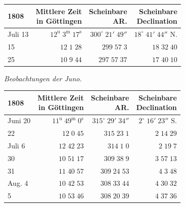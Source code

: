 \begin{center}\fontsize{10}{12}\selectfont\setlength{\tabcolsep}{3pt}\renewcommand{\arraystretch}{1.15}\begin{tabular}{lrrr}
1808 & \shortstack{Mittlere Zeit\\in Göttingen} & \shortstack{Scheinbare\\AR.} & \shortstack{Scheinbare\\Declination}\\\hline
Juli 13 & $12^{\text{u}}\;3^{\text{m}}\;17^{\text{s}}$ & $300^\circ\;21'\;49''$ & $18^\circ\;41'\;44''$ N.\\
15 & $12\;1\;28$ & $299\;57\;3$ & $18\;32\;40$\\
25 & $10\;9\;44$ & $297\;57\;37$ & $17\;40\;10$\\
\end{tabular}\end{center}


\begin{center}
\emph{Beobachtungen der Juno.}
\end{center}


\begin{center}\fontsize{10}{12}\selectfont\setlength{\tabcolsep}{3pt}\renewcommand{\arraystretch}{1.15}\begin{tabular}{lrrr}
1808 & \shortstack{Mittlere Zeit\\in Göttingen} & \shortstack{Scheinbare\\AR.} & \shortstack{Scheinbare\\Declination}\\\hline
Juni 20 & $11^{\text{u}}\;49^{\text{m}}\;0^{\text{s}}$ & $315^\circ\;29'\;34''$ & $2^\circ\;16'\;23''$ S.\\
22 & $12\;0\;45$ & $315\;23\;1$ & $2\;14\;29$\\
Juli 6 & $12\;42\;23$ & $314\;1\;0$ & $2\;19\;7$\\
30 & $10\;51\;17$ & $309\;38\;9$ & $3\;57\;13$\\
31 & $11\;40\;57$ & $309\;24\;53$ & $4\;3\;48$\\
Aug. 4 & $10\;42\;53$ & $308\;33\;44$ & $4\;30\;32$\\
5 & $10\;53\;46$ & $308\;20\;39$ & $4\;37\;36$\\
\end{tabular}\end{center}


\par{}

